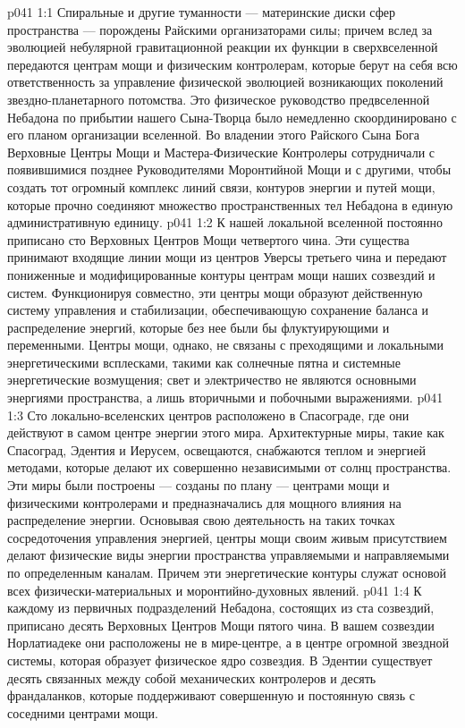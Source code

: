 \vs p041 1:1 Спиральные и другие туманности --- материнские диски сфер пространства --- порождены Райскими организаторами силы; причем вслед за эволюцией небулярной гравитационной реакции их функции в сверхвселенной передаются центрам мощи и физическим контролерам, которые берут на себя всю ответственность за управление физической эволюцией возникающих поколений звездно\hyp{}планетарного потомства. Это физическое руководство предвселенной Небадона по прибытии нашего Сына\hyp{}Творца было немедленно скоординировано с его планом организации вселенной. Во владении этого Райского Сына Бога Верховные Центры Мощи и Мастера\hyp{}Физические Контролеры сотрудничали с появившимися позднее Руководителями Моронтийной Мощи и с другими, чтобы создать тот огромный комплекс линий связи, контуров энергии и путей мощи, которые прочно соединяют множество пространственных тел Небадона в единую административную единицу.
\vs p041 1:2 К нашей локальной вселенной постоянно приписано сто Верховных Центров Мощи четвертого чина. Эти существа принимают входящие линии мощи из центров Уверсы третьего чина и передают пониженные и модифицированные контуры центрам мощи наших созвездий и систем. Функционируя совместно, эти центры мощи образуют действенную систему управления и стабилизации, обеспечивающую сохранение баланса и распределение энергий, которые без нее были бы флуктуирующими и переменными. Центры мощи, однако, не связаны с преходящими и локальными энергетическими всплесками, такими как солнечные пятна и системные энергетические возмущения; свет и электричество не являются основными энергиями пространства, а лишь вторичными и побочными выражениями.
\vs p041 1:3 Сто локально\hyp{}вселенских центров расположено в Спасограде, где они действуют в самом центре энергии этого мира. Архитектурные миры, такие как Спасоград, Эдентия и Иерусем, освещаются, снабжаются теплом и энергией методами, которые делают их совершенно независимыми от солнц пространства. Эти миры были построены --- созданы по плану --- центрами мощи и физическими контролерами и предназначались для мощного влияния на распределение энергии. Основывая свою деятельность на таких точках сосредоточения управления энергией, центры мощи своим живым присутствием делают физические виды энергии пространства управляемыми и направляемыми по определенным каналам. Причем эти энергетические контуры служат основой всех физически\hyp{}материальных и моронтийно\hyp{}духовных явлений.
\vs p041 1:4 К каждому из первичных подразделений Небадона, состоящих из ста созвездий, приписано десять Верховных Центров Мощи пятого чина. В вашем созвездии Норлатиадеке они расположены не в мире\hyp{}центре, а в центре огромной звездной системы, которая образует физическое ядро созвездия. В Эдентии существует десять связанных между собой механических контролеров и десять франдаланков, которые поддерживают совершенную и постоянную связь с соседними центрами мощи.
